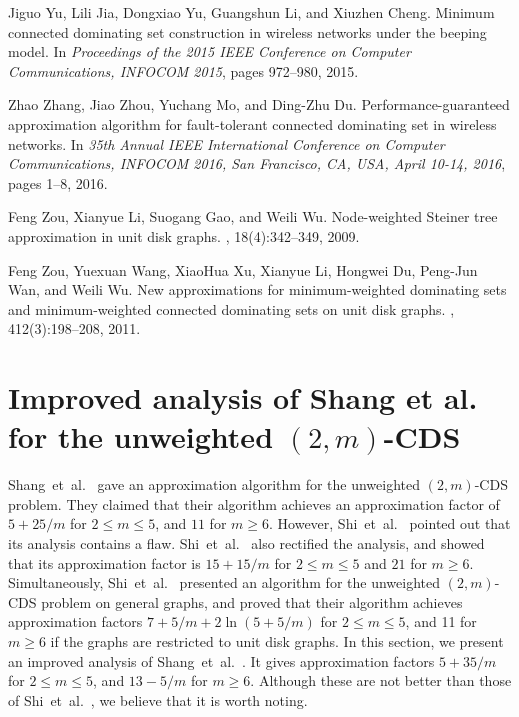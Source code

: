 \documentclass[11pt]{article}
\begin{document}
\begin{thebibliography}{10}
Jiguo Yu, Lili Jia, Dongxiao Yu, Guangshun Li, and Xiuzhen Cheng.
\newblock Minimum connected dominating set construction in wireless networks
  under the beeping model.
\newblock In {\em Proceedings of the 2015 {IEEE} Conference on Computer
  Communications, {INFOCOM} 2015}, pages 972--980, 2015.

Zhao Zhang, Jiao Zhou, Yuchang Mo, and Ding{-}Zhu Du.
\newblock Performance-guaranteed approximation algorithm for fault-tolerant
  connected dominating set in wireless networks.
\newblock In {\em 35th Annual {IEEE} International Conference on Computer
  Communications, {INFOCOM} 2016, San Francisco, CA, USA, April 10-14, 2016},
  pages 1--8, 2016.

Feng Zou, Xianyue Li, Suogang Gao, and Weili Wu.
\newblock Node-weighted {S}teiner tree approximation in unit disk graphs.
, 18(4):342--349, 2009.

Feng Zou, Yuexuan Wang, XiaoHua Xu, Xianyue Li, Hongwei Du, Peng{-}Jun Wan, and
  Weili Wu.
\newblock New approximations for minimum-weighted dominating sets and
  minimum-weighted connected dominating sets on unit disk graphs.
, 412(3):198--208, 2011.

\end{thebibliography}
 
\appendix
\section{Improved analysis of Shang et al. for the unweighted $(2,m)$-CDS}
\label{app.rect}

Shang~et~al.\ \cite{Shang:2007jg} gave an
approximation
algorithm for the unweighted $(2,m)$-CDS problem.
They claimed that their algorithm achieves an approximation factor of
$5+25/m$ for $2 \leq m \leq 5$, and $11$ for $m \geq 6$.
However, Shi~et~al.~\cite{ShiZZW16} pointed out that its analysis
contains a flaw. Shi~et~al.~\cite{ShiZZW16} also rectified the analysis, and showed
that
its approximation factor is $15+15/m$ for $2 \leq m \leq 5$
and $21$ for $m \geq 6$.
Simultaneously, 
Shi~et~al.~\cite{ShiZZW16} presented an algorithm for the unweighted $(2,m)$-CDS
problem on general graphs, and proved that their algorithm achieves
approximation factors $7+5/m+2\ln(5+5/m)$ for $2 \leq m\leq 5$,
and 11 for $m \geq 6$ if the graphs are restricted to unit disk graphs.
In this section, we present an improved analysis of  Shang~et~al.~\cite{Shang:2007jg}.
It gives approximation factors 
  $5+35/m$ for $2 \leq m \leq 5$, and 
  $13-5/m$ for $m\geq 6$.
Although these are not better than those of 
Shi~et~al.~\cite{ShiZZW16}, we believe that it is worth noting.
  
\end{document}
